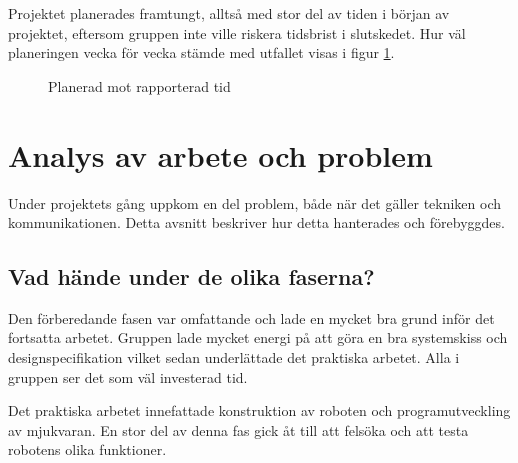 \documentclass[11pt]{article}
\begin{document}
Projektet planerades framtungt, alltså med stor del av tiden i början av projektet, eftersom gruppen inte ville riskera tidsbrist i slutskedet. Hur väl planeringen vecka för vecka stämde med utfallet visas i figur \ref{tidPlot}.



\begin{figure}
  \centering
{}
\caption{Planerad mot rapporterad tid} \label{tidPlot}
\end{figure}



\pagebreak

\section{Analys av arbete och problem}
Under projektets gång uppkom en del problem, både när det gäller tekniken och kommunikationen. Detta avsnitt beskriver hur detta hanterades och förebyggdes. 

\subsection{Vad hände under de olika faserna?}
Den förberedande fasen var omfattande och lade en mycket bra grund inför det fortsatta arbetet. Gruppen lade mycket energi på att göra en bra systemskiss och designspecifikation vilket sedan underlättade det praktiska arbetet. Alla i gruppen ser det som väl investerad tid.

Det praktiska arbetet innefattade konstruktion av roboten och programutveckling av mjukvaran. En stor del av denna fas gick åt till att felsöka och att testa robotens olika funktioner. 
\end{document}
